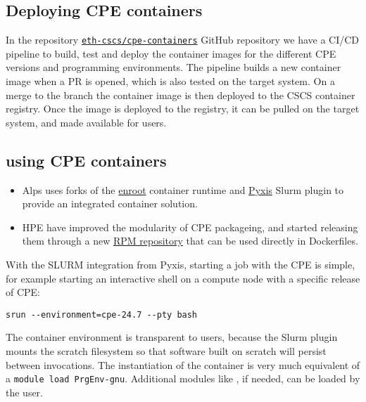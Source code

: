 \subsection{Deploying CPE containers}
\label{sec:cpe-container-deploy}

In the repository \href{https://github.com/eth-cscs/cpe-containers}{\lstinline{eth-cscs/cpe-containers}} GitHub repository we have a CI/CD pipeline to build, test and deploy the container images for the different CPE versions and programming environments.
The pipeline builds a new container image when a PR is opened, which is also tested on the target system.
On a merge to the  branch the container image is then deployed to the CSCS container registry.
Once the image is deployed to the registry, it can be pulled on the target system, and made available for users.

\subsection{using CPE containers}
\label{sec:cpe-container-use}


\begin{itemize}
       \item Alps uses forks of the \href{https://github.com/NVIDIA/enroot}{enroot} container runtime and \href{https://github.com/NVIDIA/pyxis}{Pyxis} Slurm plugin to provide an integrated container solution.
       \item HPE have improved the modularity of CPE packageing, and started releasing them through a new \href{https://cpe.ext.hpe.com/docs/latest/install/installation-guidance-container.html}{RPM repository} that can be used directly in Dockerfiles.
\end{itemize}
With the SLURM integration from Pyxis, starting a job with the CPE is simple, for example starting an interactive shell on a compute node with a specific release of CPE:
\begin{lstlisting}
srun --environment=cpe-24.7 --pty bash
\end{lstlisting}
The container environment is transparent to users, because the Slurm plugin mounts the scratch filesystem so that software built on scratch will persist between invocations.
The instantiation of the container is very much equivalent of a \lstinline{module load PrgEnv-gnu}. Additional modules like , if needed, can be loaded by the user.

